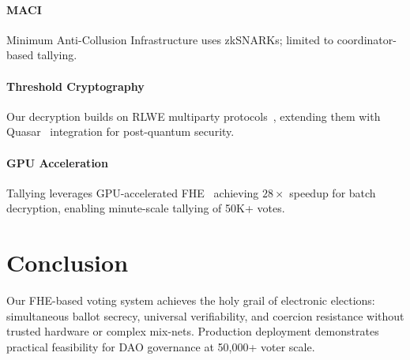 \documentclass{../shared/luxfhe}
\begin{document}
\paragraph{MACI} Minimum Anti-Collusion Infrastructure uses zkSNARKs; limited to coordinator-based tallying.

\paragraph{Threshold Cryptography} Our decryption builds on RLWE multiparty protocols~\cite{mhe-rlwe,threshold-rlwe}, extending them with Quasar~\cite{quasar} integration for post-quantum security.

\paragraph{GPU Acceleration} Tallying leverages GPU-accelerated FHE~\cite{luxcpp-fhe,gpu-fhe} achieving $28\times$ speedup for batch decryption, enabling minute-scale tallying of 50K+ votes.

\section{Conclusion}

Our FHE-based voting system achieves the holy grail of electronic elections: simultaneous ballot secrecy, universal verifiability, and coercion resistance without trusted hardware or complex mix-nets. Production deployment demonstrates practical feasibility for DAO governance at 50,000+ voter scale.



\end{document}
